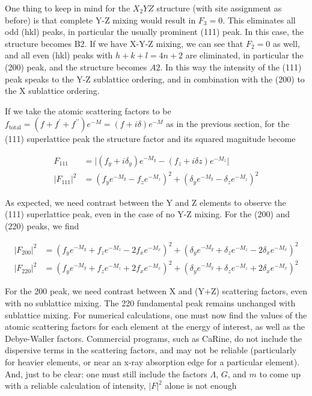 \documentclass[aps,amsmath,amssymb,prb,superscriptaddress,longtable,preprint,fleqn]{revtex4}
\begin{document}
One thing to keep in mind for the $X_2YZ$ structure (with site assignment as before) is that complete Y-Z mixing would result in $F_3=0$. This eliminates all odd (hkl) peaks, in particular the usually prominent (111) peak. In this case, the structure becomes B2. If we have X-Y-Z mixing, we can see that $F_2=0$ as well, and all even (hkl) peaks with $h+k+l=4n+2$ are eliminated, in particular the (200) peak, and the structure becomes $A2$. In this way the intensity of the (111) peak speaks to the Y-Z sublattice ordering, and in combination with the (200) to the X sublattice ordering. 

If we take the atomic scattering factors to be $f_{\text{total}}\!=\!(f+f^\prime + f^{\prime\prime})e^{-M} = (f + i\delta)e^{-M}$ as in the previous section, for the (111) superlattice peak the structure factor and its squared magnitude become

\begin{align}
F_{111} &= \lvert \left(f_y + i\delta_y\right)e^{-M_y} - \left(f_z + i\delta z\right)e^{-M_z} \rvert\\
|F_{111}|^2 &= \left(f_y e^{-M_y} - f_ze^{-M_z}\right)^2 + \left(\delta_y e^{-M_y}-\delta_z e^{-M_z}\right)^2
\end{align}

As expected, we need contrast between the Y and Z elements to observe the (111) superlattice peak, even in the case of no Y-Z mixing. For the (200) and (220) peaks, we find

\begin{align}
|F_{200}|^2 &= \left(f_y e^{-M_y} + f_z e^{-M_z} - 2f_x e^{-M_x}\right)^2 + \left(\delta_y e^{-M_y} + \delta_z e^{-M_z} - 2\delta_x e^{-M_x}\right)^2\\
|F_{220}|^2 &= \left(f_y e^{-M_y} + f_z e^{-M_z} + 2f_x e^{-M_x}\right)^2 + \left(\delta_y e^{-M_y} + \delta_z e^{-M_z} + 2\delta_x e^{-M_x}\right)^2
\end{align}

For the 200 peak, we need contrast between X and (Y+Z) scattering factors, even with no sublattice mixing. The 220 fundamental peak remains unchanged with sublattice mixing. For numerical calculations, one must now find the values of the atomic scattering factors for each element at the energy of interest,\cite{itc} as well as the Debye-Waller factors. Commercial programs, such as CaRine, do not include the dispersive terms in the scattering factors, and may not be reliable (particularly for heavier elements, or near an x-ray absorption edge for a particular element). And, just to be clear: one must still include the factors $\Lambda$, $G$, and $m$ to come up with a reliable calculation of intensity, $|F|^2$ alone is not enough
\end{document}
